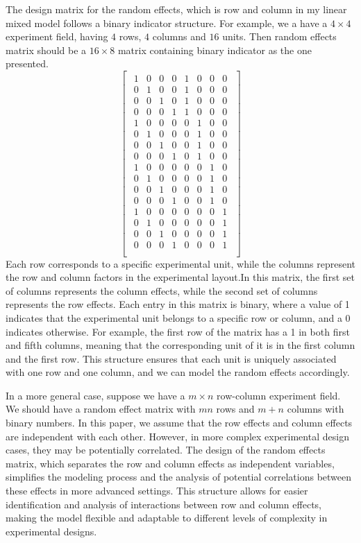 \documentclass[
  a4paper,
  oneside,
  openany,
  12pt,
  onecolumn]{book}
\theoremstyle{definition}
\theoremstyle{plain}
\theoremstyle{remark}
\begin{document}
The design matrix for the random effects, which is row and column in my
linear mixed model follows a binary indicator structure. For example, we
a have a \(4\times 4\) experiment field, having \(4\) rows, \(4\)
columns and \(16\) units. Then random effects matrix should be a
\(16 \times 8\) matrix containing binary indicator as the one presented.
\[
\begin{bmatrix}
\begin{array}{cccc|cccc}
1 & 0 & 0 & 0 & 1 & 0 & 0 & 0 \\
0 & 1 & 0 & 0 & 1 & 0 & 0 & 0 \\
0 & 0 & 1 & 0 & 1 & 0 & 0 & 0 \\
0 & 0 & 0 & 1 & 1 & 0 & 0 & 0 \\
1 & 0 & 0 & 0 & 0 & 1 & 0 & 0 \\
0 & 1 & 0 & 0 & 0 & 1 & 0 & 0 \\
0 & 0 & 1 & 0 & 0 & 1 & 0 & 0 \\
0 & 0 & 0 & 1 & 0 & 1 & 0 & 0 \\
1 & 0 & 0 & 0 & 0 & 0 & 1 & 0 \\
0 & 1 & 0 & 0 & 0 & 0 & 1 & 0 \\
0 & 0 & 1 & 0 & 0 & 0 & 1 & 0 \\
0 & 0 & 0 & 1 & 0 & 0 & 1 & 0 \\
1 & 0 & 0 & 0 & 0 & 0 & 0 & 1 \\
0 & 1 & 0 & 0 & 0 & 0 & 0 & 1 \\
0 & 0 & 1 & 0 & 0 & 0 & 0 & 1 \\
0 & 0 & 0 & 1 & 0 & 0 & 0 & 1 \\
\end{array}
\end{bmatrix}
\] Each row corresponds to a specific experimental unit, while the
columns represent the row and column factors in the experimental
layout.In this matrix, the first set of columns represents the column
effects, while the second set of columns represents the row effects.
Each entry in this matrix is binary, where a value of 1 indicates that
the experimental unit belongs to a specific row or column, and a 0
indicates otherwise. For example, the first row of the matrix has a 1 in
both first and fifth columns, meaning that the corresponding unit of it
is in the first column and the first row. This structure ensures that
each unit is uniquely associated with one row and one column, and we can
model the random effects accordingly.

In a more general case, suppose we have a \(m\times n\) row-column
experiment field. We should have a random effect matrix with \(mn\) rows
and \(m+n\) columns with binary numbers. In this paper, we assume that
the row effects and column effects are independent with each other.
However, in more complex experimental design cases, they may be
potentially correlated. The design of the random effects matrix, which
separates the row and column effects as independent variables,
simplifies the modeling process and the analysis of potential
correlations between these effects in more advanced settings. This
structure allows for easier identification and analysis of interactions
between row and column effects, making the model flexible and adaptable
to different levels of complexity in experimental designs.
\end{document}
